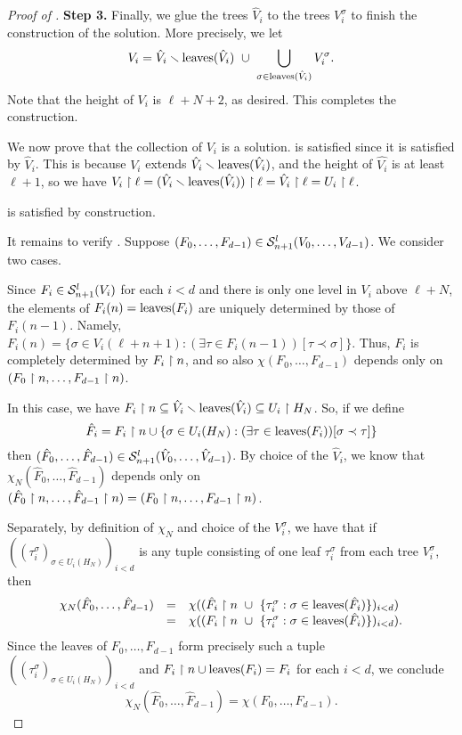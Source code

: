 \begin{proof}[Proof of ]
  \medskip
  \noindent \textbf{Step 3.} Finally, we glue the trees $\hat V_i$ to the trees $V_i^\sigma$ to finish the construction of the solution. More precisely, we let
  \[
  	V_i = \hat V_i \smallsetminus \operatorname{leaves}(\hat V_i)~\cup~{\bigcup_{\sigma \in \operatorname{leaves}(\hat V_i)} V^\sigma_i}.
  \]
  Note that the height of $V_i$ is $\ell + N + 2$, as desired. This completes the construction.
  
  \verification We now prove that the collection of $V_i$ is a solution.  is satisfied since it is satisfied by $\hat V_i$. This is because $V_i$ extends $\hat V_i\smallsetminus\operatorname{leaves}(\hat V_i)$, and the height of $\hat{V_i}$ is at least $\ell + 1$, so we have ${V_i \upharpoonright \ell} = (\hat V_i\smallsetminus\operatorname{leaves}(\hat V_i)) \upharpoonright \ell = {\hat V_i \upharpoonright \ell} = U_i \upharpoonright \ell$.
  
   is satisfied by construction.
  
  It remains to verify . Suppose $(F_0,\dots, F_{d-1}) \in \mathcal{S}^{l}_{n+1}({V_0,\dots, V_{d-1}})$. We consider two cases.
  
   Since $F_i \in \mathcal{S}^{l}_{n+1}({V_i})$ for each $i < d$ and there is only one level in $V_i$ above $\ell+N$, the elements of $F_i(n) = \operatorname{leaves}(F_i)$ are uniquely determined by those of $F_i(n-1)$. Namely, $F_i(n) = \{\sigma \in V_i(\ell + n + 1): (\exists \tau \in F_i(n-1))[\tau \prec \sigma]\}$. Thus, $F_i$ is completely determined by $F_i \upharpoonright n$, and so also $\chi(F_0,\ldots,F_{d-1})$ depends only on $(F_0 \upharpoonright n,\ldots,F_{d-1} \upharpoonright n)$.
  
   In this case, we have $F_i \upharpoonright n \subseteq \hat{V}_i \smallsetminus \operatorname{leaves}(\hat{V}_i) \subseteq U_i \upharpoonright H_N$. So, if we define
  \[
  	\hat F_i = F_i \upharpoonright n \cup \{ \sigma \in U_i(H_N): (\exists \tau \in \operatorname{leaves}(F_i))[\sigma \prec \tau]\}
  \]
  then $(\hat F_0,\ldots,\hat F_{d-1}) \in \mathcal{S}^{l}_{n+1}({\hat{V}_0,\ldots,\hat{V}_{d-1}})$. By choice of the $\hat V_i$, we know that $\chi_N(\hat{F}_0,\ldots,\hat F_{d-1})$ depends only on $(\hat{F}_0 \upharpoonright n,\ldots,\hat{F}_{d-1} \upharpoonright n) = (F_0 \upharpoonright n,\ldots,F_{d-1} \upharpoonright n)$.
  
  Separately, by definition of $\chi_N$ and choice of the $V^\sigma_i$, we have that if $((\tau_i^\sigma)_{\sigma\in U_i(H_N)})_{i<d}$ is any tuple consisting of one leaf $\tau^\sigma_i$ from each tree $V_i^\sigma$, then 
  \[
  	\begin{array}{lll}
  		\chi_N(\hat{F}_0,\ldots,\hat F_{d-1}) & = &  \chi((\hat F_i \upharpoonright n~\cup~\{ \tau_i^\sigma: \sigma \in \operatorname{leaves}(\hat F_i)\})_{i < d})\\
  		& = & \chi((F_i \upharpoonright n~\cup~\{ \tau_i^\sigma: \sigma \in \operatorname{leaves}(\hat F_i)\})_{i < d}).
  	\end{array}
  \]
  Since the leaves of $F_0,\ldots,F_{d-1}$ form precisely such a tuple $((\tau_i^\sigma)_{\sigma\in U_i(H_N)})_{i<d}$ and $F_i \upharpoonright n \cup \operatorname{leaves}(F_i) = F_i$ for each $i < d$, we conclude
  \[
  	\chi_N(\hat{F}_0,\ldots,\hat F_{d-1}) = \chi(F_0,\ldots,F_{d-1}).
  \]
  

\end{proof}
